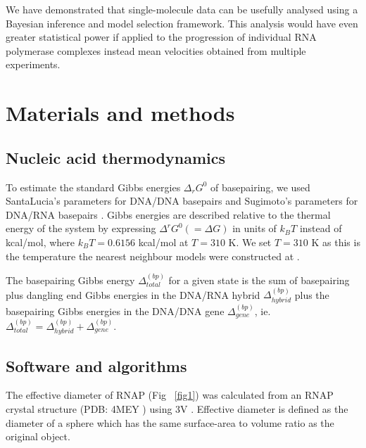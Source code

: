 \documentclass[10pt,letterpaper]{article}
\begin{document}
We have demonstrated that single-molecule data can be usefully analysed using a Bayesian inference and model selection framework. This analysis would have even greater statistical power if applied to the progression of individual RNA polymerase complexes instead mean velocities obtained from multiple experiments.  \\



\section*{Materials and methods}


\subsection*{Nucleic acid thermodynamics}

To estimate the standard Gibbs energies $\Delta_r G^0$ of basepairing, we used SantaLucia's parameters for DNA/DNA basepairs \cite{santalucia1998unified} and Sugimoto's parameters for DNA/RNA basepairs \cite{wu2002temperature}. Gibbs energies are described relative to the thermal energy of the system by expressing $\Delta^rG^0 ( = \Delta G)$ in units of $k_BT$ instead of kcal/mol, where $k_BT = 0.6156$ kcal/mol at $T=310$ K. We set $T=310$ K as this is the temperature the nearest neighbour models were constructed at \cite{santalucia1998unified, wu2002temperature}. \par

The basepairing Gibbs energy $\Delta^{(bp)}_{total}$ for a given state is the sum of basepairing plus dangling end Gibbs energies in the DNA/RNA hybrid $\Delta^{(bp)}_{hybrid}$ plus the basepairing Gibbs energies in the DNA/DNA gene $\Delta^{(bp)}_{gene}$, ie. $\Delta^{(bp)}_{total} = \Delta^{(bp)}_{hybrid} + \Delta^{(bp)}_{gene}$.



\subsection*{Software and algorithms}

The effective diameter of RNAP (Fig ~\ref{fig1}) was calculated from an RNAP crystal structure (PDB: 4MEY \cite{degen2014transcription}) using 3V \cite{voss20103v}. Effective diameter is defined as the diameter of a sphere which has the same surface-area to volume ratio as the original object. \par
\end{document}
